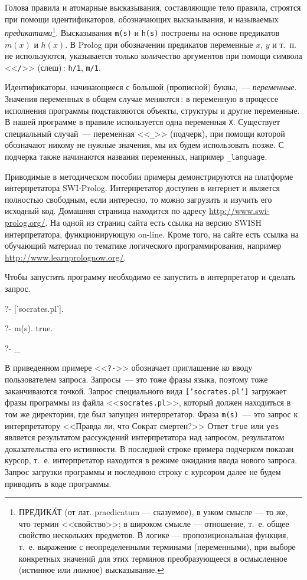 \documentclass[a4paper,14pt, openany, twoside, draft]{extbook} %
\begin{document}
Голова правила и атомарные высказывания, составляющие тело правила, строятся при помощи идентификаторов, обозначающих высказывания, и называемых \emph{предикатами}\footnote{ПРЕДИК\'{А}Т (от лат. praedicatum --- сказуемое), в узком смысле --- то же, что термин <<свойство>>; в широком смысле --- отношение, т.~е. общее свойство нескольких предметов. В логике --- пропозициональная функция, т.~е. выражение с неопределенными терминами (переменными), при выборе конкретных значений для этих терминов преобразующееся в осмысленное (истинное или ложное) высказывание.}.  Высказывания \texttt{m(s)} и \texttt{h(s)} построены на основе предикатов $m(x)$ и $h(x)$.  В Prolog при обозначении предикатов переменные $x$, $y$ и т.~п. не используются, указывается только количество аргументов при помощи символа <<\texttt{/}>> (слеш)\,: \texttt{h/1}, \texttt{m/1}.

Идентификаторы, начинающиеся с большой (прописной) буквы,~--- \emph{переменные}.  Значения переменных в общем случае меняются\,: в переменную в процессе исполнения программы подставляются объекты, структуры и другие переменные.  В нашей программе в правиле используется одна переменная \texttt{X}.  Существует специальный случай~--- переменная <<\texttt{\_}>> (подчерк), при помощи которой обозначают никому не нужные значения, мы их будем использовать позже.  С подчерка также начинаются названия переменных, например \texttt{\_language}.

Приводимые в методическом пособии примеры демонстрируются на платформе интерпретатора SWI-Prolog.  Интерпретатор доступен в интернет и является полностью свободным, если интересно, то можно загрузить и изучить его исходный код.  Домашняя страница находится по адресу \url{http://www.swi-prolog.org/}.  На одной из страниц сайта есть ссылка на версию SWISH интерпретатора, функционирующую on-line.  Кроме того, на сайте есть ссылка на обучающий материал по тематике логического программирования, например \url{http://www.learnprolognow.org/}.

Чтобы запустить программу необходимо ее запустить в интерпретатор и сделать запрос.

\begin{proexp}
?- ['socrates.pl'].    %

?- m(s).               %
true.

?- _
\end{proexp}

  В приведенном примере <<\texttt{?-}>> обозначает приглашение ко вводу пользователем запроса.  Запросы~--- это тоже фразы языка, поэтому тоже заканчиваются точкой.  Запрос специального вида \texttt{['socrates.pl']} загружает фразы программы из файла <<\texttt{socrates.pl}>>, который должен находиться в том же директории, где был запущен интерпретатор.  Фраза \texttt{m(s)}~--- это запрос к интерпретатору <<Правда ли, что Сократ смертен?>>  Ответ \texttt{true} или \texttt{yes} является результатом рассуждений интерпретатора над запросом, результатом доказательства его истинности.  В последней строке примера подчерком показан курсор, т.~е. интерпретатор находится в режиме ожидания ввода нового запроса.  Запрос загрузки программы и последнюю строку с курсором далее не будем приводить в коде программы.
\end{document}
